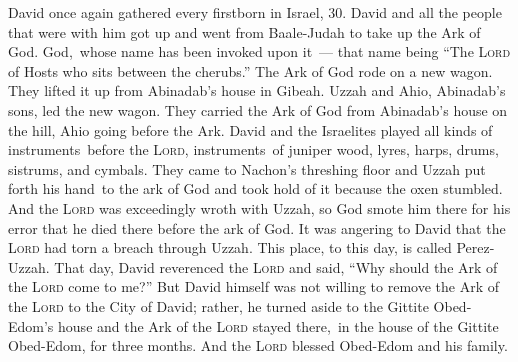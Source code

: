 
\begin{inparaenum}
     David once again gathered every firstborn in Israel, 30.%
     David and all the people that were with him got up and went from Baale-Judah to take up the Ark of God. God,\understood\ whose name has been invoked upon it~--- that name being ``The \textsc{Lord} of Hosts who sits between the cherubs.''%
     The Ark of God rode on a new wagon. They lifted it up from Abinadab's house in Gibeah. Uzzah and Ahio, Abinadab's sons, led the new wagon.%
     They carried the Ark of God from Abinadab's house on the hill, Ahio going before the Ark.%
     David and the Israelites played all kinds of instruments\understood\ before the \textsc{Lord}, instruments\understood\ of juniper wood, lyres, harps, drums, sistrums, and cymbals.%
     They came to Nachon's threshing floor and Uzzah put forth his hand\understood\ to the ark of God and took hold of it because the oxen stumbled.%
     And the \textsc{Lord} was exceedingly wroth with Uzzah, so God smote him there for his error that he died there before the ark of God.%
     It was angering to David that the \textsc{Lord} had torn a breach through Uzzah. This place, to this day, is called Perez-Uzzah.%
     That day, David reverenced the \textsc{Lord} and said, ``Why should the Ark of the \textsc{Lord} come to me?''%
     But David himself was not willing to remove the Ark of the \textsc{Lord} to the City of David; rather, he turned aside to the Gittite Obed-Edom's house%
     and the Ark of the \textsc{Lord} stayed there,\understood\ in the house of the Gittite Obed-Edom, for three months. And the \textsc{Lord} blessed Obed-Edom and his family.%

\end{inparaenum}
